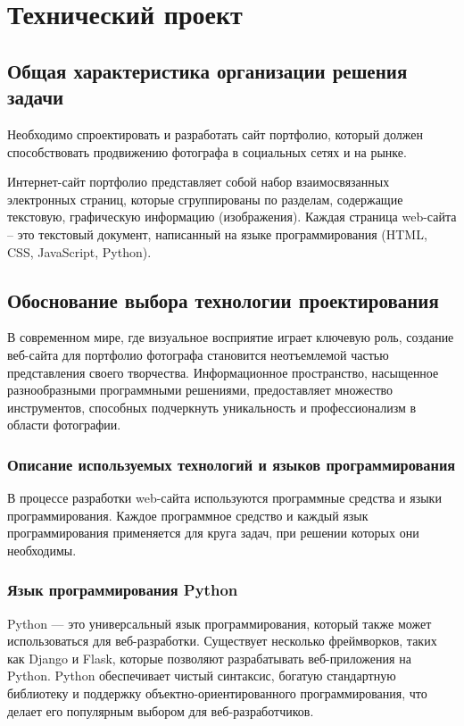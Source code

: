 \section{Технический проект}
\subsection{Общая характеристика организации решения задачи}

Необходимо спроектировать и разработать сайт портфолио, который должен способствовать продвижению фотографа в социальных сетях и на рынке.

Интернет-сайт портфолио представляет собой набор взаимосвязанных электронных страниц, которые сгруппированы по разделам, содержащие текстовую, графическую информацию (изображения). Каждая страница web-сайта – это текстовый документ, написанный на языке программирования (HTML, CSS, JavaScript, Python).

\subsection{Обоснование выбора технологии проектирования}

В современном мире, где визуальное восприятие играет ключевую роль, создание веб-сайта для портфолио фотографа становится неотъемлемой частью представления своего творчества. Информационное пространство, насыщенное разнообразными программными решениями, предоставляет множество инструментов, способных подчеркнуть уникальность и профессионализм в области фотографии.

\subsubsection{Описание используемых технологий и языков программирования}

В процессе разработки web-сайта используются программные средства и языки программирования. Каждое программное средство и каждый язык программирования применяется для круга задач, при решении которых они необходимы.

\subsubsection{Язык программирования Python}

Python — это универсальный язык программирования, который также может использоваться для веб-разработки. Существует несколько фреймворков, таких как Django и Flask, которые позволяют разрабатывать веб-приложения на Python. Python обеспечивает чистый синтаксис, богатую стандартную библиотеку и поддержку объектно-ориентированного программирования, что делает его популярным выбором для веб-разработчиков.


